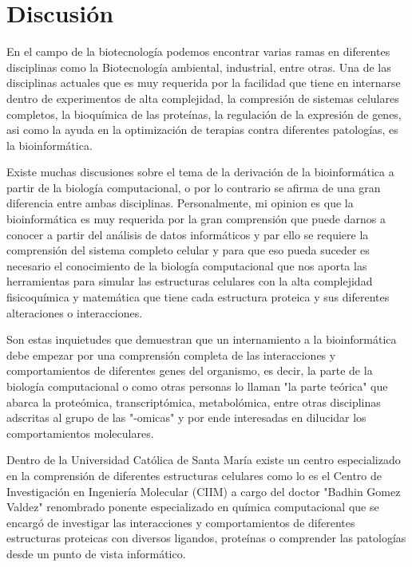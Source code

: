 \documentclass[a4paper,12pt]{article}
\begin{document}
    
        
\section{Discusión}
    

En el campo de la biotecnología podemos encontrar varias ramas en diferentes disciplinas como la Biotecnología ambiental, industrial, entre otras. Una de las disciplinas actuales que es muy requerida por la facilidad que tiene en internarse dentro de experimentos de alta complejidad, la compresión de sistemas celulares completos, la bioquímica de las proteínas, la regulación de la expresión de genes, asi como la ayuda en la optimización de terapias contra diferentes patologías, es la bioinformática.

Existe muchas discusiones sobre el tema de la derivación de la bioinformática a partir de la biología computacional, o por lo contrario se afirma de una gran diferencia entre ambas disciplinas.
Personalmente, mi opinion es que la bioinformática es muy requerida por la gran comprensión que puede darnos a conocer a partir del análisis de datos informáticos y par ello se requiere la comprensión del sistema completo celular y para que eso pueda suceder es necesario el conocimiento de la biología computacional que nos aporta las herramientas para simular las estructuras celulares con la alta complejidad fisicoquímica y matemática que tiene cada estructura proteica y sus diferentes alteraciones o interacciones.
   
Son estas inquietudes que demuestran que un internamiento a la bioinformática debe empezar por una comprensión completa de las interacciones y comportamientos de diferentes genes del organismo, es decir, la parte de la biología computacional o como otras personas lo llaman "la parte teórica" que abarca la proteómica, transcriptómica, metabolómica, entre otras disciplinas adscritas al grupo de las "-omicas" y por ende interesadas en dilucidar los comportamientos moleculares. 
   
Dentro de la Universidad Católica de Santa María existe un centro especializado en la comprensión de diferentes estructuras celulares como lo es el Centro de Investigación en Ingeniería Molecular (CIIM) a cargo del doctor "Badhin Gomez Valdez" renombrado ponente especializado en química computacional que se encargó de investigar las interacciones y comportamientos de diferentes estructuras proteicas con diversos ligandos, proteínas o comprender las patologías desde un punto de vista informático.
   
\end{document}
